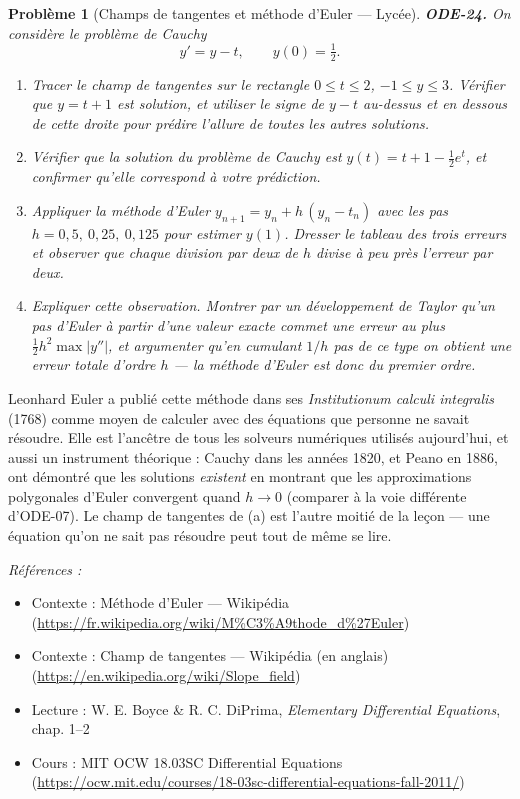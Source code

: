 \documentclass[11pt]{article}
\newtheorem{problem}{Problème}
\newenvironment{refs}{\par\small\noindent\emph{Références :}\begin{itemize}\setlength\itemsep{0pt}}{\end{itemize}\normalsize}
\begin{document}
\bigskip

\begin{problem}[{Champs de tangentes et méthode d'Euler --- Lycée}]
\textbf{ODE-24.} On considère le problème de Cauchy
\[ y' = y - t, \qquad y(0) = \tfrac{1}{2}. \]
\begin{enumerate}
\item[(a)] Tracer le champ de tangentes sur le rectangle $ 0 \le t \le 2 $, $ -1 \le y \le 3 $.
Vérifier que $ y = t + 1 $ est solution, et utiliser le signe de $ y - t $ au-dessus et
en dessous de cette droite pour prédire l'allure de toutes les autres solutions.
\item[(b)] Vérifier que la solution du problème de Cauchy est
$ y(t) = t + 1 - \tfrac{1}{2}e^{t} $, et confirmer qu'elle correspond à votre prédiction.
\item[(c)] Appliquer la méthode d'Euler $ y_{n+1} = y_n + h\,(y_n - t_n) $ avec les pas
$ h = 0{,}5,\ 0{,}25,\ 0{,}125 $ pour estimer $ y(1) $. Dresser le tableau des trois erreurs
et observer que chaque division par deux de $ h $ divise à peu près l'erreur par deux.
\item[(d)] Expliquer cette observation. Montrer par un développement de Taylor qu'un pas d'Euler à
partir d'une valeur exacte commet une erreur au plus $ \tfrac{1}{2}h^2 \max|y''| $, et
argumenter qu'en cumulant $ 1/h $ pas de ce type on obtient une erreur totale d'ordre $ h $ ---
la méthode d'Euler est donc du \textit{premier ordre}.
\end{enumerate}

\end{problem}

\noindent Leonhard Euler a publié cette méthode dans ses \textit{Institutionum calculi
integralis} (1768) comme moyen de calculer avec des équations que personne ne savait résoudre.
Elle est l'ancêtre de tous les solveurs numériques utilisés aujourd'hui, et aussi un instrument
théorique : Cauchy dans les années 1820, et Peano en 1886, ont démontré que les solutions
\textit{existent} en montrant que les approximations polygonales d'Euler convergent quand
$ h \to 0 $ (comparer à la voie différente d'ODE-07). Le champ de tangentes de (a) est l'autre
moitié de la leçon --- une équation qu'on ne sait pas résoudre peut tout de même se lire.

\begin{refs}
\item Contexte : Méthode d'Euler --- Wikipédia (\url{https://fr.wikipedia.org/wiki/M%C3%A9thode_d%27Euler})
\item Contexte : Champ de tangentes --- Wikipédia (en anglais) (\url{https://en.wikipedia.org/wiki/Slope_field})
\item Lecture : W. E. Boyce \& R. C. DiPrima, \textit{Elementary Differential Equations}, chap. 1--2
\item Cours : MIT OCW 18.03SC Differential Equations (\url{https://ocw.mit.edu/courses/18-03sc-differential-equations-fall-2011/})
\end{refs}
\end{document}

